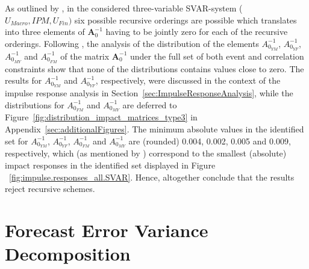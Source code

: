 \documentclass[a4paper,11pt,listof=nochaptergap,oneside,pointednumbers,bibtotoc,bigheadings,liststotoc,hidelinks]{scrbook}
\theoremstyle{mysatz}
\theoremstyle{mydefinition}
\theoremstyle{mytheorem}
\theoremstyle{mybemerkung}
\newcommand{\vect}[1]{\boldsymbol{\mathbf{#1}}}
\begin{document}
As outlined by \citet{ludvigsonetal:19}, in the considered three-variable SVAR-system ($U_{Macro}, IPM, U_{Fin})$ six possible recursive orderings are possible which translates into three elements of $\vect{A}_0^{-1}$ having to be jointly zero for each of the recursive orderings. Following \citet{ludvigsonetal:19}, the analysis of the distribution of the elements $A_{0_{YM}}^{-1}$, $A_{0_{YF}}^{-1}$, $A_{0_{MY}}^{-1}$ and $A_{0_{FM}}^{-1}$ of the matrix $\vect{A}_0^{-1}$ under the full set of both event and correlation constraints show that none of the distributions contains values close to zero. The results for $A_{0_{YM}}^{-1}$ and $A_{0_{YF}}^{-1}$, respectively, were discussed in the context of the impulse response analysis in Section~\ref{sec:ImpulseResponseAnalysis}, while the distributions for $A_{0_{FM}}^{-1}$ and $A_{0_{MY}}^{-1}$ are deferred to Figure~\ref{fig:distribution_impact_matrices_type3} in Appendix~\ref{sec:additionalFigures}. The minimum absolute values in the identified set for $A_{0_{YM}}^{-1}$, $A_{0_{YF}}^{-1}$, $A_{0_{FM}}^{-1}$ and $A_{0_{MY}}^{-1}$ are (rounded) 0.004, 0.002, 0.005 and 0.009, respectively, which (as mentioned by \citealp{ludvigsonetal:19}) correspond to the smallest (absolute) impact responses in the identified set displayed in Figure ~\ref{fig:impulse.responses_all.SVAR}. Hence, altogether \citet{ludvigsonetal:19} conclude that the results reject recursive schemes.

\section[Forecast Error Variance Decomposition]{Forecast Error Variance Decomposition}
\label{sec:FEVD}
\end{document}
